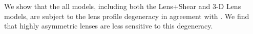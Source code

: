 We show that the all models, including both the Lens+Shear and 3-D Lens models, are subject to the lens profile degeneracy in agreement with \citet{Xu15,Schneider13}. We find that highly asymmetric lenses are less sensitive to this degeneracy.